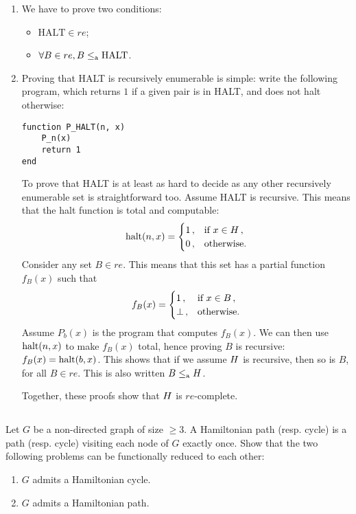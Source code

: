 \begin{solution}
	\begin{enumerate}
		\item We have to prove two conditions:
		\begin{itemize}
			\item \(\mathrm{HALT} \in re\);
			\item \(\forall B \in re, B \le_\textnormal{a} \mathrm{HALT}\).
		\end{itemize}
		\item Proving that HALT is recursively enumerable is simple:
		write the following program,
		which returns \(1\) if a given pair is in HALT,
		and does not halt otherwise:
\begin{verbatim}
function P_HALT(n, x)
	P_n(x)
	return 1
end
\end{verbatim}

		To prove that HALT is at least as hard to decide
		as any other recursively enumerable set
		is straightforward too.
		Assume HALT is recursive.
		This means that the halt function is total and computable:
		\[
		\mathrm{halt}(n, x) = \begin{cases} 1\,, & \textnormal{if } x\in H\,,\\ 0\,, & \textnormal{otherwise.}\end{cases}
		\]
		Consider any set \(B \in re\).
		This means that this set has a partial function \(f_B(x)\)
		such that
		\[
		f_B(x) = \begin{cases} 1\,, & \textnormal{if } x\in B\,,\\ \bot\,, & \textnormal{otherwise.}\end{cases}
		\]
		Assume \(P_b(x)\) is the program that computes \(f_B(x)\).
		We can then use \(\mathrm{halt}(n, x)\) to make \(f_B(x)\) total,
		hence proving \(B\) is recursive:
		\(f_B(x) = \mathrm{halt}(b, x)\).
		This shows that if we assume \(H\) is recursive,
		then so is \(B\), for all \(B \in re\).
		This is also written \(B \le_\textnormal{a} H\).

		Together, these proofs show that \(H\) is \(re\)-complete.
	\end{enumerate}
\end{solution}

\subsection{} %
Let \(G\) be a non-directed graph of size \(\ge 3\).
A Hamiltonian path (resp. cycle) is a path (resp. cycle)
visiting each node of \(G\) exactly once.
Show that the two following problems can be functionally reduced to each other:
\begin{enumerate}
	\item \(G\) admits a Hamiltonian cycle.
	\item \(G\) admits a Hamiltonian path.
\end{enumerate}

